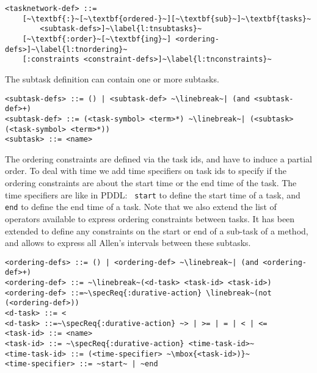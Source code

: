 \documentclass[letterpaper]{article} %
\begin{document}
\begin{lstlisting}[firstnumber=last, escapechar=~]
<tasknetwork-def> ::=
    [~\textbf{:}~[~\textbf{ordered-}~][~\textbf{sub}~]~\textbf{tasks}~
        <subtask-defs>]~\label{l:tnsubtasks}~
    [~\textbf{:order}~[~\textbf{ing}~] <ordering-defs>]~\label{l:tnordering}~
    [:constraints <constraint-defs>]~\label{l:tnconstraints}~
\end{lstlisting}

%
%
\noindent The subtask definition can contain one or more subtasks.

\begin{lstlisting}[firstnumber=last, escapechar=~]
<subtask-defs> ::= () | <subtask-def> ~\linebreak~| (and <subtask-def>+)
<subtask-def> ::= (<task-symbol> <term>*) ~\linebreak~| (<subtask> (<task-symbol> <term>*))
<subtask> ::= <name>
\end{lstlisting}

%
%
The ordering constraints are defined via the task ids, and have to induce a partial order. To deal with time we add time specifiers on task ids to specify if the ordering constraints are about the start time or the end time of the task. The time specifiers are like in PDDL: ~{\tt start} to define the start time of a task, and {\tt end}  to define the end time of a task. Note that we also extend the list of operators available to express ordering constraints between tasks. It has been extended to define any constraints on the start or end of a sub-task of a method, and allows to express all Allen's intervals \citep{allen81} between these subtasks.

\begin{lstlisting}[firstnumber=last, escapechar=~]
<ordering-defs> ::= () | <ordering-def> ~\linebreak~| (and <ordering-def>+)
<ordering-def> ::= ~\linebreak~(<d-task> <task-id> <task-id>)
<ordering-def> ::=~\specReq{:durative-action} \linebreak~(not (<ordering-def>))
<d-task> ::= <
<d-task> ::=~\specReq{:durative-action} ~> | >= | = | < | <=
<task-id> ::= <name>
<task-id> ::= ~\specReq{:durative-action} <time-task-id>~
<time-task-id> ::= (<time-specifier> ~\mbox{<task-id>)}~
<time-specifier> ::= ~start~ | ~end
\end{lstlisting}
\end{document}
